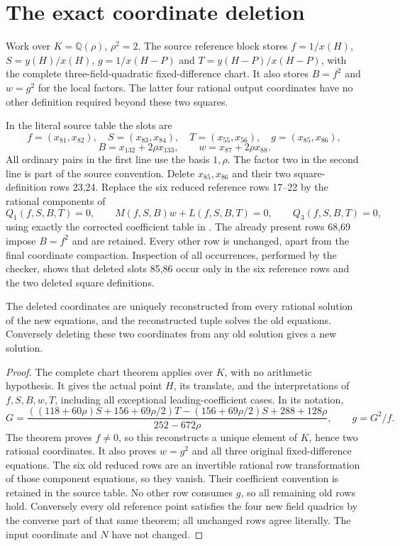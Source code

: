 \documentclass[11pt,a4paper]{article}
\newcommand{\Q}{\mathbb Q}\newcommand{\Z}{\mathbb Z}
\begin{document}
\section{The exact coordinate deletion}
Work over $K=\Q(\rho)$, $\rho^2=2$. The source reference block stores
$f=1/x(H)$, $S=y(H)/x(H)$, $g=1/x(H-P)$ and $T=y(H-P)/x(H-P)$,
with the complete three-field-quadratic fixed-difference chart. It also
stores $B=f^2$ and $w=g^2$ for the local factors. The latter four
rational output coordinates have no other definition required beyond
these two squares.

In the literal source table the slots are
\[
 f=(x_{81},x_{82}),\quad S=(x_{83},x_{84}),\quad T=(x_{55},x_{56}),
 \quad g=(x_{85},x_{86}),
\]
\[
 B=x_{132}+2\rho x_{133},\qquad w=x_{87}+2\rho x_{88}.
\]
All ordinary pairs in the first line use the basis $1,\rho$.
The factor two in the second line is part of the source convention.
Delete $x_{85},x_{86}$ and their two square-definition rows 23,24.
Replace the six reduced reference rows 17--22 by the rational
components of
\[
 Q_1(f,S,B,T)=0,\qquad M(f,S,B)w+L(f,S,B,T)=0,
 \qquad Q_3(f,S,B,T)=0,
\]
using exactly the corrected coefficient table in \cite{Chart}.
The already present rows 68,69 impose $B=f^2$ and are retained.
Every other row is unchanged, apart from the final coordinate
compaction. Inspection of all occurrences, performed by the checker,
shows that deleted slots 85,86 occur only in the six reference rows
and the two deleted square definitions.

\begin{lemma}\label{lem:equivalent}
The deleted coordinates are uniquely reconstructed from every rational
solution of the new equations, and the reconstructed tuple solves the
old equations. Conversely deleting these two coordinates from any old
solution gives a new solution.
\end{lemma}
\begin{proof}
The complete chart theorem \cite[Theorem~1.1]{Chart} applies over $K$,
with no arithmetic hypothesis. It gives the actual point $H$, its
translate, and the interpretations of $f,S,B,w,T$, including all
exceptional leading-coefficient cases. In its notation,
\[
 G=\frac{((118+60\rho)S+156+69\rho/2)T-(156+69\rho/2)S+288+128\rho}
              {252-672\rho},\qquad g=G^2/f.
\]
The theorem proves $f\ne0$, so this reconstructs a unique element of
$K$, hence two rational coordinates. It also proves $w=g^2$ and all
three original fixed-difference equations. The six old reduced rows
are an invertible rational row transformation of those component
equations, so they vanish. Their coefficient convention is retained
in the source table. No other row consumes $g$, so all remaining old
rows hold. Conversely every old reference point satisfies the four
new field quadrics by the converse part of that same theorem; all
unchanged rows agree literally. The input coordinate and $N$ have
not changed.
\end{proof}
\end{document}
